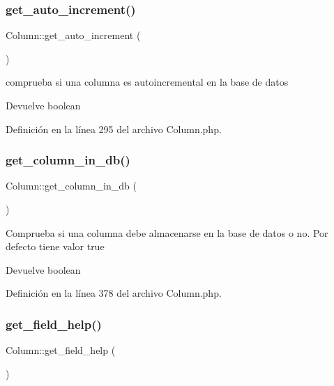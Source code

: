 \subsubsection{\texorpdfstring{get\_auto\_increment()}{get\_auto\_increment()}}
{\footnotesize\ttfamily Column\+::get\+\_\+auto\+\_\+increment (\begin{DoxyParamCaption}{ }\end{DoxyParamCaption})}

comprueba si una columna es autoincremental en la base de datos

\begin{DoxyReturn}{Devuelve}
boolean 
\end{DoxyReturn}


Definición en la línea 295 del archivo Column.\+php.

\mbox{\label{class_column_ac730ad2d5ffed1e805200bf0cdc15064}} 
\subsubsection{\texorpdfstring{get\_column\_in\_db()}{get\_column\_in\_db()}}
{\footnotesize\ttfamily Column\+::get\+\_\+column\+\_\+in\+\_\+db (\begin{DoxyParamCaption}{ }\end{DoxyParamCaption})}

Comprueba si una columna debe almacenarse en la base de datos o no. Por defecto tiene valor true

\begin{DoxyReturn}{Devuelve}
boolean 
\end{DoxyReturn}


Definición en la línea 378 del archivo Column.\+php.

\mbox{\label{class_column_a1fe455614c5937aec57db013d23df078}} 
\subsubsection{\texorpdfstring{get\_field\_help()}{get\_field\_help()}}
{\footnotesize\ttfamily Column\+::get\+\_\+field\+\_\+help (\begin{DoxyParamCaption}{ }\end{DoxyParamCaption})}

